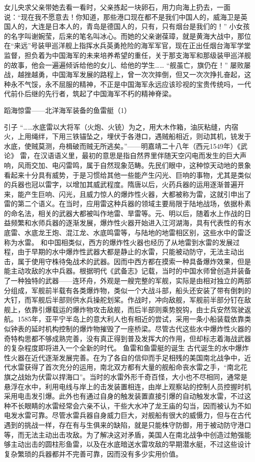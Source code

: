 \documentclass[12pt,UTF8]{ctexbook}
\begin{document}
女儿央求父亲带她去看一看时，父亲拣起一块卵石，用力向海上扔去，一面说：“现在我不愿意去！你知道，那些港口现在都不是我们中国人的，威海卫是英国人的，大连是日本人的，青岛是德国人的，只有，只有烟台是我们的！”
小女孩的名字叫谢婉莹，后来的笔名叫冰心。而她的父亲谢葆璋，就是黄海大战中，那位在“来远”号装甲巡洋舰上指挥水兵英勇抢险的海军军官，现在正出任烟台海军学堂监督，担负着为中国海军的未来培养希望的重任，关于那支海军和那级装甲巡洋舰的故事，他会一遍遍倾诉给他的女儿、给他的学生……
“舰虽亡，旗仍在！”
屡败屡战，越挫越勇，中国海军发展的路程上，曾一次次摔倒，但又一次次挣扎奋起，这种永不气馁，永不屈服的精神，不正是中国海军永远应该珍视的宝贵传统吗，一代代前仆后继的先行者，筑起了中国海军不朽的精神脊梁。




蹈海惊雷——北洋海军装备的鱼雷艇（1）

引子
“……水底雷以大将军（火炮、火铳）为之，用大木作箱，油灰粘缝，内宿火，上用绳绊，下用三铁锚坠之，埋伏于各港口，遇贼船相近，则动其机，铳发于水底，使贼莫测，舟楫破而贼无所逃矣。”——明嘉靖二十八年（西元1549年）《武论》
雷，在汉语语义里，最初的意思是指自然界里伴随天空闪电而发生的巨大声响，风雨交加、电闪雷鸣，属于自然现象范畴。先民们眼中，这种惊天动地的景象看起来十分具有威势，于是习惯给其他一些能产生闪光、巨响的事物，尤其是类似的兵器也冠以雷字，以增加其威武程度。隋唐以后，火药兵器的运用逐渐普遍开来，能产生巨响、闪光，且威力惊人的爆炸性火器，大都被称为雷，这就引申出了雷的第二个语义。在当时，应用雷这种兵器的领域主要局限于陆地战场，依据朴素的命名法，相关的武器大都被叫作地雷、旱雷等。元、明以后，随着水上作战的日益频繁和水师兵器的逐渐发展，爆炸性火器开始进入江河湖海，具有代表性的有水底雷、水底龙王炮、混江龙、水底鸣雷等，与陆地的地雷相区别，这些水中的雷泛称为水雷。
和中国相类似，西方的爆炸性火器也经历了从地雷到水雷的发展过程，由于早期的水中爆炸性武器大都是静止的水雷，只能被动防守，无法主动出击，属于使用守株待兔战术的武器。因而中西方都在摸索一种具备爆炸效果，但是能主动攻敌的水中兵器。根据明代《武备志》记载，当时的中国水师曾创造并装备了一种独特的武器——连环舟，外观是一艘完整的军舰，实际是由相对独立的两部分组成，军舰前半载有各类爆炸物，类似一个大战斗部，船头还安装了带有倒刺的大钉，而军舰后半部则供水兵操舵划桨。作战时，冲向敌舰，军舰前半部分钉在敌舰上，依靠引爆载运的爆炸物攻击敌舰，而后半部则乘势脱钩，由士兵安然驾驶返航。1585年，亚平宁半岛上的意大利人也有相近的尝试，采用一条小船装载依靠类似钟表的延时机构控制的爆炸物摧毁了一座桥梁。尽管古代这些水中爆炸性火器的奇特构思都不够成熟完善，没有真正得到普及发挥大的作用，但却标志着海战武器的复杂程度即将进入一个全新的时代。
鱼雷和鱼雷艇的诞生
古代诞生的水中爆炸性火器在近代逐渐发展完善。在为了各自的信仰而手足相残的美国南北战争中，近代水雷获得了首次充分的运用，南北双方都有大量的舰船命丧水雷之手，“南北花旗之战始为伏雷以捍海口”。当时的水雷外形千奇百怪，大小也不尽相同，通常是悬浮在水中，利用电线与岸上的击发装置相连，由岸上观察站的控制人员控握时机采用电击发引爆。此外也有通过自身的触发装置直接引爆的自动触发水雷，不过这种不长眼睛的水雷经常会六亲不认，干些大水冲了龙王庙的勾当，因而被认为不如电发水雷可靠。尽管水雷兵器自身威力巨大，对舰船有很大的威慑力，但与在古代遇到的挑战一样，存在有与生俱来的缺陷，就是只能株守防御，用于被动防守港口等，而无法主动出击攻敌。为了解决这对矛盾，美国人在南北战争中创造过勉强能够主动出击的圆柱形鱼雷，以及在水底暗送水雷攻敌的早期潜水艇，不过这些设计复杂繁琐的兵器都并不完善可靠，因而没有多少实用价值。
\end{document}
